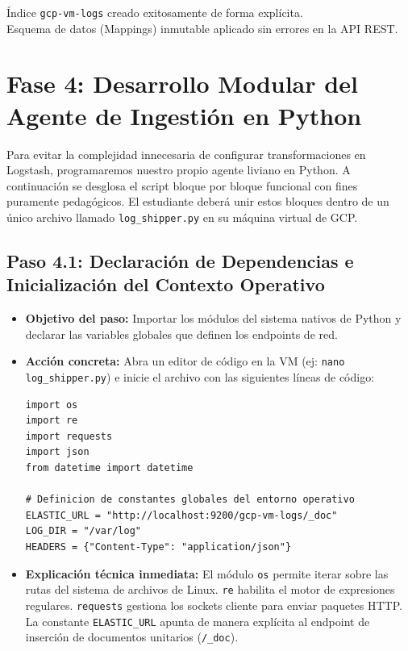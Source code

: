 \documentclass[
  coursetitle={Cómputo Nube y Tecnologías Emergentes},
  coursehours={96},
  coursedate={Verano 2026},
  doctype={Práctica},
  otherlangs={english,french},
  authorname={Lázaro},
  authorsurname={Bustio-Martínez},
  authortitle={PhD},
  role={Profesor Investigador},
  email={lbustio@inaoe.mx},
  phone={5559504000},
  ext={7459},
  institution={Instituto Nacional de Astrofísica, Óptica y Electrónica (INAOE)},
  department={Maestría en Ciencias en Tecnologías de Seguridad},
  address={Luis Enrique Erro 1, Sta. Ma. Tonantzintla, San Andrés Cholula, CP 72840, Puebla, México},
  margin={0.5in}
]{../../lbustio_lecture_notes}
\begin{document}
\begin{tcolorbox}[colback=green!5!white,colframe=green!60!black,title=\textbf{Checkpoint de Validación 2}]
\checkmark Índice \texttt{gcp-vm-logs} creado exitosamente de forma explícita.\\
\checkmark Esquema de datos (Mappings) inmutable aplicado sin errores en la API REST.
\end{tcolorbox}

\section{Fase 4: Desarrollo Modular del Agente de Ingestión en Python}

Para evitar la complejidad innecesaria de configurar transformaciones en Logstash, programaremos nuestro propio agente liviano en Python. A continuación se desglosa el script bloque por bloque funcional con fines puramente pedagógicos. El estudiante deberá unir estos bloques dentro de un único archivo llamado \texttt{log\_shipper.py} en su máquina virtual de GCP.

\subsection{Paso 4.1: Declaración de Dependencias e Inicialización del Contexto Operativo}
\begin{itemize}
    \item \textbf{Objetivo del paso:} Importar los módulos del sistema nativos de Python y declarar las variables globales que definen los endpoints de red.
    \item \textbf{Acción concreta:} Abra un editor de código en la VM (ej: \texttt{nano log\_shipper.py}) e inicie el archivo con las siguientes líneas de código:
\begin{verbatim}
import os
import re
import requests
import json
from datetime import datetime

# Definicion de constantes globales del entorno operativo
ELASTIC_URL = "http://localhost:9200/gcp-vm-logs/_doc"
LOG_DIR = "/var/log"
HEADERS = {"Content-Type": "application/json"}
\end{verbatim}
    \item \textbf{Explicación técnica inmediata:} El módulo \texttt{os} permite iterar sobre las rutas del sistema de archivos de Linux. \texttt{re} habilita el motor de expresiones regulares. \texttt{requests} gestiona los sockets cliente para enviar paquetes HTTP. La constante \texttt{ELASTIC\_URL} apunta de manera explícita al endpoint de inserción de documentos unitarios (\texttt{/\_doc}).
\end{itemize}
\end{document}
